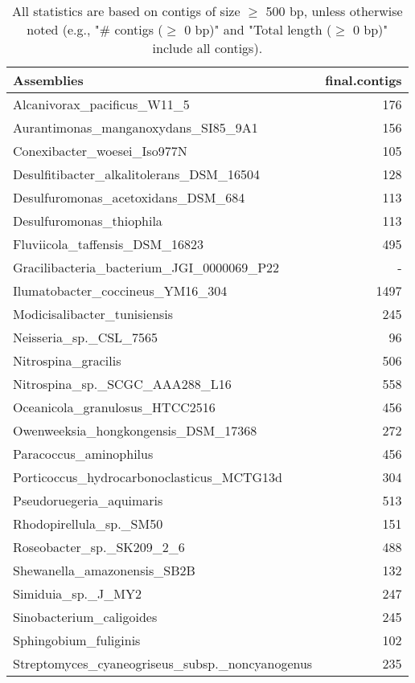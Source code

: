 \documentclass[12pt,a4paper]{article}
\begin{document}
\begin{table}[ht]
\begin{center}
\caption{All statistics are based on contigs of size $\geq$ 500 bp, unless otherwise noted (e.g., "\# contigs ($\geq$ 0 bp)" and "Total length ($\geq$ 0 bp)" include all contigs).}
\begin{tabular}{|l*{1}{|r}|}
\hline
Assemblies & final.contigs \\ \hline
Alcanivorax\_pacificus\_W11\_5 & 176 \\ \hline
Aurantimonas\_manganoxydans\_SI85\_9A1 & 156 \\ \hline
Conexibacter\_woesei\_Iso977N & 105 \\ \hline
Desulfitibacter\_alkalitolerans\_DSM\_16504 & 128 \\ \hline
Desulfuromonas\_acetoxidans\_DSM\_684 & 113 \\ \hline
Desulfuromonas\_thiophila & 113 \\ \hline
Fluviicola\_taffensis\_DSM\_16823 & 495 \\ \hline
Gracilibacteria\_bacterium\_JGI\_0000069\_P22 & - \\ \hline
Ilumatobacter\_coccineus\_YM16\_304 & 1497 \\ \hline
Modicisalibacter\_tunisiensis & 245 \\ \hline
Neisseria\_sp.\_CSL\_7565 & 96 \\ \hline
Nitrospina\_gracilis & 506 \\ \hline
Nitrospina\_sp.\_SCGC\_AAA288\_L16 & 558 \\ \hline
Oceanicola\_granulosus\_HTCC2516 & 456 \\ \hline
Owenweeksia\_hongkongensis\_DSM\_17368 & 272 \\ \hline
Paracoccus\_aminophilus & 456 \\ \hline
Porticoccus\_hydrocarbonoclasticus\_MCTG13d & 304 \\ \hline
Pseudoruegeria\_aquimaris & 513 \\ \hline
Rhodopirellula\_sp.\_SM50 & 151 \\ \hline
Roseobacter\_sp.\_SK209\_2\_6 & 488 \\ \hline
Shewanella\_amazonensis\_SB2B & 132 \\ \hline
Simiduia\_sp.\_J\_MY2 & 247 \\ \hline
Sinobacterium\_caligoides & 245 \\ \hline
Sphingobium\_fuliginis & 102 \\ \hline
Streptomyces\_cyaneogriseus\_subsp.\_noncyanogenus & 235 \\ \hline

\end{tabular}
\end{center}
\end{table}
\end{document}
